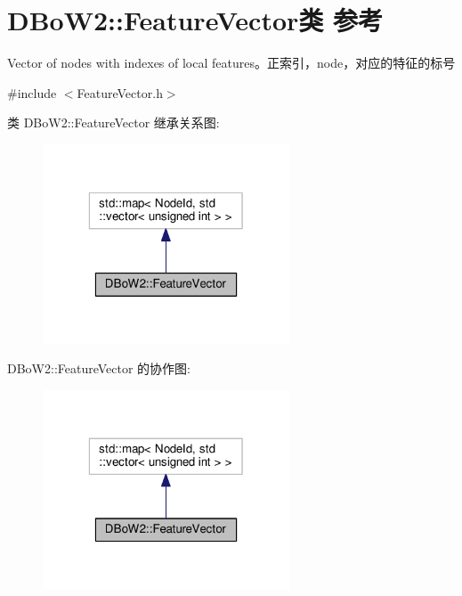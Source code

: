 \hypertarget{classDBoW2_1_1FeatureVector}{\section{D\-Bo\-W2\-:\-:Feature\-Vector类 参考}
\label{classDBoW2_1_1FeatureVector}
}


Vector of nodes with indexes of local features。正索引，node，对应的特征的标号  




{\ttfamily \#include $<$Feature\-Vector.\-h$>$}



类 D\-Bo\-W2\-:\-:Feature\-Vector 继承关系图\-:
\nopagebreak
\begin{figure}[H]
\begin{center}
\leavevmode
\includegraphics[width=208pt]{classDBoW2_1_1FeatureVector__inherit__graph}
\end{center}
\end{figure}


D\-Bo\-W2\-:\-:Feature\-Vector 的协作图\-:
\nopagebreak
\begin{figure}[H]
\begin{center}
\leavevmode
\includegraphics[width=208pt]{classDBoW2_1_1FeatureVector__coll__graph}
\end{center}
\end{figure}
